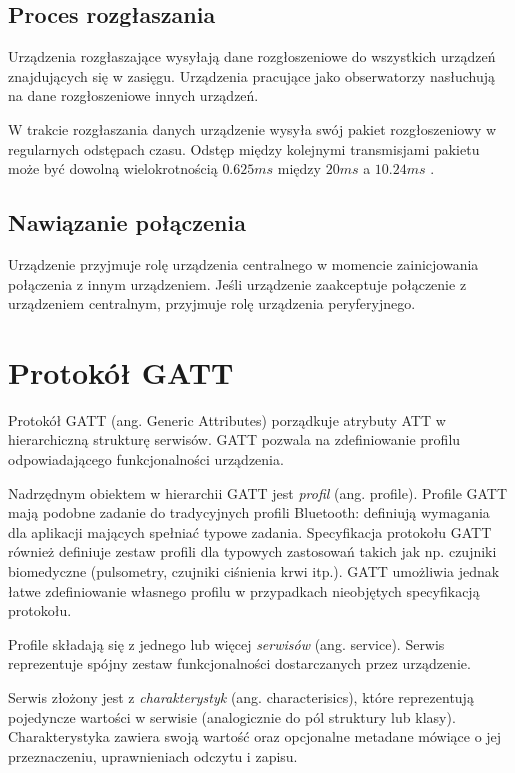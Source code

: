\subsection{Proces rozgłaszania}

Urządzenia rozgłaszające wysyłają dane rozgłoszeniowe do wszystkich urządzeń
znajdujących się w zasięgu. Urządzenia pracujące jako obserwatorzy nasłuchują na
dane rozgłoszeniowe innych urządzeń.

W trakcie rozgłaszania danych urządzenie wysyła swój pakiet rozgłoszeniowy
w regularnych odstępach czasu. Odstęp między kolejnymi transmisjami pakietu może
być dowolną wielokrotnością $0.625ms$ między $20ms$ a $10.24ms$
\cite{bluetooth42}.

\subsection{Nawiązanie połączenia}

Urządzenie przyjmuje rolę urządzenia centralnego w momencie zainicjowania
połączenia z innym urządzeniem. Jeśli urządzenie zaakceptuje połączenie
z urządzeniem centralnym, przyjmuje rolę urządzenia peryferyjnego.

\section{Protokół GATT}

Protokół GATT (ang. Generic Attributes) porządkuje atrybuty ATT w hierarchiczną
strukturę serwisów. GATT pozwala na zdefiniowanie profilu odpowiadającego
funkcjonalności urządzenia.

Nadrzędnym obiektem w hierarchii GATT jest \emph{profil} (ang. profile). Profile
GATT mają podobne zadanie do tradycyjnych profili Bluetooth: definiują wymagania
dla aplikacji mających spełniać typowe zadania. Specyfikacja protokołu GATT
również definiuje zestaw profili dla typowych zastosowań takich jak np. czujniki
biomedyczne (pulsometry, czujniki ciśnienia krwi itp.). GATT umożliwia jednak
łatwe zdefiniowanie własnego profilu w przypadkach nieobjętych specyfikacją
protokołu.

Profile składają się z jednego lub więcej \emph{serwisów} (ang. service). Serwis
reprezentuje spójny zestaw funkcjonalności dostarczanych przez urządzenie.

Serwis złożony jest z \emph{charakterystyk} (ang. characterisics), które
reprezentują pojedyncze wartości w serwisie (analogicznie do pól struktury lub
klasy). Charakterystyka zawiera swoją wartość oraz opcjonalne metadane mówiące
o jej przeznaczeniu, uprawnieniach odczytu i zapisu.

